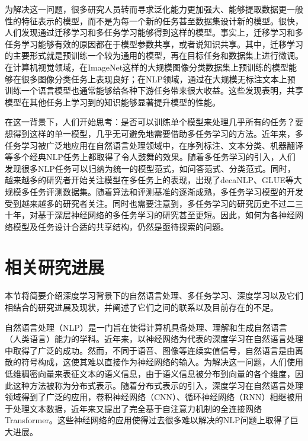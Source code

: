 为解决这一问题，很多研究人员转而寻求泛化能力更加强大、能够提取数据更一般性的特征表示的模型，而不是为每一个新的任务甚至数据集设计新的模型。很快，人们发现通过迁移学习和多任务学习能够得到这样的模型。事实上，迁移学习和多任务学习能够有效的原因都在于模型参数共享，或者说知识共享。其中，迁移学习的主要形式就是预训练一个较为通用的模型，再在目标任务和数据集上进行微调。在计算机视觉领域，在ImageNet\cite{DBLP:conf/cvpr/DengDSLL009}这样的大规模图像分类数据集上预训练的模型能够在很多图像分类任务上表现良好；在NLP领域，通过在大规模无标注文本上预训练一个语言模型也通常能够给各种下游任务带来很大收益\cite{DBLP:conf/naacl/PetersNIGCLZ18}\cite{radford2018improving}。这些发现表明，共享模型在其他任务上学习到的知识能够显著提升模型的性能。

在这一背景下，人们开始思考：是否可以训练单个模型来处理几乎所有的任务？要想得到这样的单一模型，几乎无可避免地需要借助多任务学习的方法。近年来，多任务学习被广泛地应用在自然语言处理领域中，在序列标注、文本分类、机器翻译等多个经典NLP任务上都取得了令人鼓舞的效果。随着多任务学习的引入，人们发现很多NLP任务可以归纳为统一的模型范式，如问答范式\cite{mccann2018natural}、分类范式\cite{radford2018improving}\cite{devlin2018bert}。同时，越来越多的研究者开始关注模型在多任务上的表现，出现了decaNLP\cite{mccann2018natural}、GLUE\cite{DBLP:conf/emnlp/WangSMHLB18}等大规模多任务评测数据集。随着算法和评测基准的逐渐成熟，多任务学习模型的开发受到越来越多的研究者关注。同时也需要注意到，多任务学习的研究历史不过二三十年，对基于深层神经网络的多任务学习的研究甚至更短。因此，如何为各神经网络模型及任务设计合适的共享结构，仍然是亟待探索的问题。

\section{相关研究进展}

本节将简要介绍深度学习背景下的自然语言处理、多任务学习、深度学习以及它们相结合的研究进展及现状，并阐述了它们之间的联系以及目前存在的不足。

自然语言处理（NLP）是一门旨在使得计算机具备处理、理解和生成自然语言（人类语言）能力的学科。近年来，以神经网络为代表的深度学习在自然语言处理\cite{DBLP:journals/jmlr/CollobertWBKKK11}\cite{DBLP:conf/emnlp/BordesCW14}\cite{DBLP:conf/acl/JeanCMB15}\cite{DBLP:conf/nips/SutskeverVL14}中取得了广泛的成功。然而，不同于语音、图像等连续实值信号，自然语言是由离散的符号构成，这使其难以直接作为神经网络的输入。为解决这一问题，人们使用低维稠密向量来表征文本的语义信息\cite{DBLP:conf/nips/MikolovSCCD13}\cite{DBLP:conf/emnlp/PenningtonSM14}，由于语义信息被分布到向量的各个维度，因此这种方法被称为分布式表示。随着分布式表示的引入，深度学习在自然语言处理领域得到了广泛的应用，卷积神经网络（CNN）、循环神经网络（RNN）相继被用于处理文本数据，近年来又提出了完全基于自注意力机制的全连接网络Transformer。这些神经网络的应用使得过去很多难以解决的NLP问题上取得了巨大进展。

